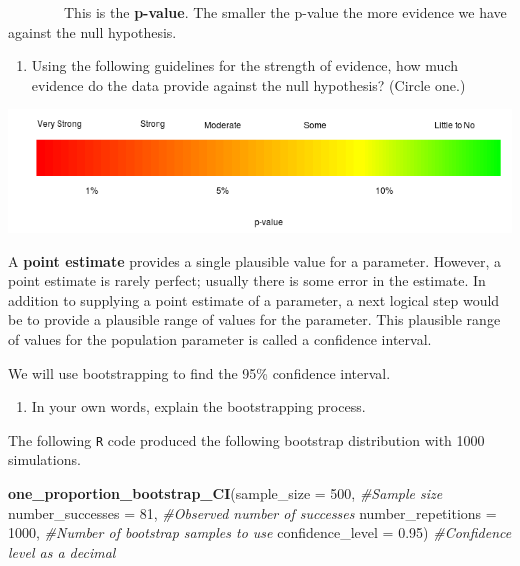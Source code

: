\documentclass[
]{report}
\newenvironment{Shaded}{\begin{snugshade}}{\end{snugshade}}
\newcommand{\CommentTok}[1]{\textcolor[rgb]{0.56,0.35,0.01}{\textit{#1}}}
\newcommand{\DataTypeTok}[1]{\textcolor[rgb]{0.13,0.29,0.53}{#1}}
\newcommand{\DecValTok}[1]{\textcolor[rgb]{0.00,0.00,0.81}{#1}}
\newcommand{\FloatTok}[1]{\textcolor[rgb]{0.00,0.00,0.81}{#1}}
\newcommand{\KeywordTok}[1]{\textcolor[rgb]{0.13,0.29,0.53}{\textbf{#1}}}
\newcommand{\NormalTok}[1]{#1}
\providecommand{\tightlist}{%
  \setlength{\itemsep}{0pt}\setlength{\parskip}{0pt}}
\begin{document}
\vspace{1in}

~~~~~~~~This is the \textbf{p-value}. The smaller the p-value the more evidence we have against the null hypothesis.

\begin{enumerate}
\def\labelenumi{\arabic{enumi}.}
\setcounter{enumi}{22}
\tightlist
\item
  Using the following guidelines for the strength of evidence, how much evidence do the data provide against the null hypothesis? (Circle one.)
\end{enumerate}

\includegraphics{images/soe_gradient.png}

A \textbf{point estimate} provides a single plausible value for a parameter. However, a point estimate is rarely perfect; usually there is some error in the estimate. In addition to supplying a point estimate of a parameter, a next logical step would be to provide a plausible range of values for the parameter. This plausible range of values for the population parameter is called a confidence interval.

We will use bootstrapping to find the 95\% confidence interval.

\begin{enumerate}
\def\labelenumi{\arabic{enumi}.}
\setcounter{enumi}{23}
\tightlist
\item
  In your own words, explain the bootstrapping process.
  \vspace{1in}
\end{enumerate}

The following \texttt{R} code produced the following bootstrap distribution with 1000 simulations.

\begin{Shaded}
\begin{Highlighting}[]
\KeywordTok{one_proportion_bootstrap_CI}\NormalTok{(}\DataTypeTok{sample_size =} \DecValTok{500}\NormalTok{, }\CommentTok{#Sample size}
                    \DataTypeTok{number_successes =} \DecValTok{81}\NormalTok{, }\CommentTok{#Observed number of successes}
                    \DataTypeTok{number_repetitions =} \DecValTok{1000}\NormalTok{, }\CommentTok{#Number of bootstrap samples to use}
                    \DataTypeTok{confidence_level =} \FloatTok{0.95}\NormalTok{) }\CommentTok{#Confidence level as a decimal}
\end{Highlighting}
\end{Shaded}
\end{document}
